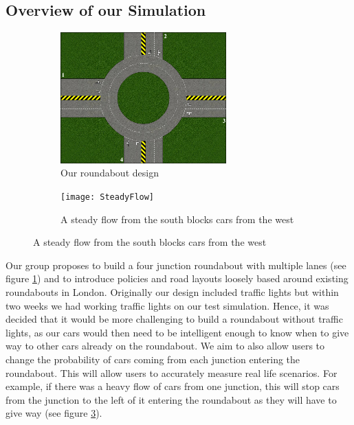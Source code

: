 \documentclass[11pt]{article}
\begin{document}
	\subsection{Overview of our Simulation}
	\begin{figure}
    \centering
    	\begin{subfigure}{.35\textwidth}
        	\centering
			\includegraphics[width=0.7\textwidth]{Roundabout2}
			\caption{Our roundabout design}
			\label{Roundabout Design}
        \end{subfigure}
    	\begin{subfigure}{.35\textwidth}
			\centering
			\texttt{[image: SteadyFlow]}
			\caption{A steady flow from the south blocks cars from the west}
			\label{SteadyFlow}
	\end{subfigure}
	
	\end{figure}
	Our group proposes to build a four junction roundabout with multiple lanes (see figure \ref{Roundabout Design}) and to introduce policies and road layouts loosely based around existing roundabouts in London. Originally our design included traffic lights but within two weeks we had working traffic lights on our test simulation. 
	Hence, it was decided that it would be more challenging to build a roundabout without traffic lights, as our cars would then need to be intelligent enough to know when to give way to other cars already on the roundabout. 
	We aim to also allow users to change the probability of cars coming from each junction entering the roundabout. 
	This will allow users to accurately measure real life scenarios. 
	For example, if there was a heavy flow of cars from one junction, this will stop cars from the junction to the left of it entering the roundabout as they will have to give way (see figure \ref{SteadyFlow}).
	
\end{document}
